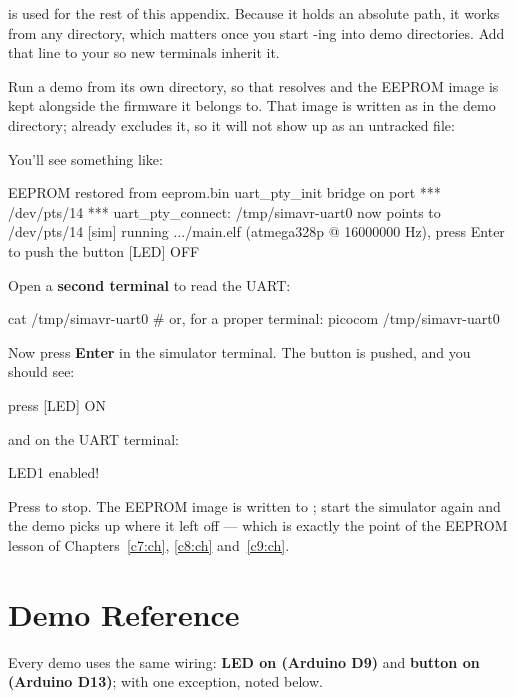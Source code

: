 \noindent{} is used for the rest of this appendix. Because it holds an absolute path, it
works from any directory, which matters once you start -ing into demo directories. Add
that  line to your  so new terminals inherit it.

Run a demo from its own directory, so that  resolves and the EEPROM image is kept
alongside the firmware it belongs to. That image is written as  in the demo
directory;  already excludes it, so it will not show up as an untracked file:


\noindent You'll see something like:

\begin{console}
[sim] EEPROM restored from eeprom.bin
uart_pty_init bridge on port *** /dev/pts/14 ***
uart_pty_connect: /tmp/simavr-uart0 now points to /dev/pts/14
[sim] running .../main.elf (atmega328p @ 16000000 Hz), press Enter to push the button
[LED] OFF
\end{console}

\noindent Open a \textbf{second terminal} to read the UART:

\begin{shell}
cat /tmp/simavr-uart0
# or, for a proper terminal:
picocom /tmp/simavr-uart0
\end{shell}

\noindent Now press \textbf{Enter} in the simulator terminal. The button is pushed, and you should
see:

\begin{console}
[BTN] press
[LED] ON
\end{console}

\noindent and on the UART terminal:

\begin{console}
LED1 enabled!
\end{console}

\noindent Press  to stop. The EEPROM image is written to ; start the
simulator again and the demo picks up where it left off --- which is exactly the point of the
EEPROM lesson of Chapters~\ref{c7:ch}, \ref{c8:ch} and~\ref{c9:ch}.

\section{Demo Reference}
\label{sim:sec:reference}
Every demo uses the same wiring: \textbf{LED on  (Arduino D9)} and \textbf{button on
 (Arduino D13)}; with one exception, noted below.

